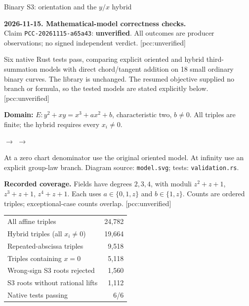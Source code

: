 \documentclass[10pt]{article}
\begin{document}
\begin{center}\LARGE Binary S3: orientation and the $y/x$ hybrid\end{center}
\textbf{2026-11-15. Mathematical-model correctness checks.}\\
Claim \texttt{PCC-20261115-a65a43}: \textbf{unverified}. All outcomes are producer observations; no signed independent verdict. [pcc:unverified]

Six native Rust tests pass, comparing explicit oriented and hybrid third-summation models with direct chord/tangent addition on 18 small ordinary binary curves. The library is unchanged. The resumed objective supplied no branch or formula, so the tested models are stated explicitly below. [pcc:unverified]

\textbf{Domain:} $E:y^2+xy=x^3+ax^2+b$, characteristic two, $b\ne0$. All triples are finite; the hybrid requires every $x_i\ne0$.

\begin{center}
$\to$
$\to$
\end{center}
At a zero chart denominator use the original oriented model. At infinity use an explicit group-law branch. Diagram source: \texttt{model.svg}; tests: \texttt{validation.rs}.

\textbf{Recorded coverage.} Fields have degrees $2,3,4$, with moduli $z^2+z+1$, $z^3+z+1$, $z^4+z+1$. Each uses $a\in\{0,1,z\}$ and $b\in\{1,z\}$. Counts are ordered triples; exceptional-case counts overlap. [pcc:unverified]
\begin{center}\begin{tabular}{lr}
All affine triples &24,782\\
Hybrid triples (all $x_i\ne0$)&19,664\\
Repeated-abscissa triples&9,518\\
Triples containing $x=0$&5,118\\
Wrong-sign S3 roots rejected&1,560\\
S3 roots without rational lifts&1,112\\
Native tests passing&6/6
\end{tabular}\end{center}
\end{document}
